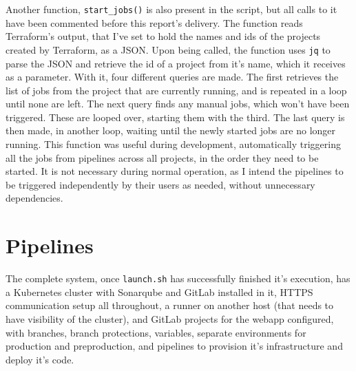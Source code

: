 \documentclass[11pt]{article}
\begin{document}
\begin{flushleft}
    Another function, \texttt{start\_jobs()} is also present in the script, but all calls to it have been commented before this report's delivery. The function reads Terraform's output, that I've set to hold the names and ids of the projects created by Terraform, as a JSON. Upon being called, the function uses \texttt{jq} to parse the JSON and retrieve the id of a project from it's name, which it receives as a parameter. With it, four different queries are made. The first retrieves the list of jobs from the project that are currently running, and is repeated in a loop until none are left. The next query finds any manual jobs, which won't have been triggered. These are looped over, starting them with the third. The last query is then made, in another loop, waiting until the newly started jobs are no longer running. This function was useful during development, automatically triggering all the jobs from pipelines across all projects, in the order they need to be started. It is not necessary during normal operation, as I intend the pipelines to be triggered independently by their users as needed, without unnecessary dependencies.





    

\clearpage
\section{Pipelines}
The complete system, once \texttt{launch.sh} has successfully finished it's execution, has a Kubernetes cluster with Sonarqube and GitLab installed in it, HTTPS communication setup all throughout, a runner on another host (that needs to have visibility of the cluster), and GitLab projects for the webapp configured, with branches, branch protections, variables, separate environments for production and preproduction, and pipelines to provision it's infrastructure and deploy it's code.
\linebreak


\end{flushleft}
\end{document}
